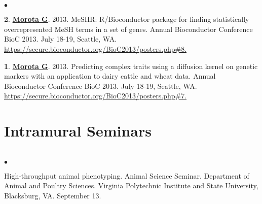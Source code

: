 \documentclass[margin,line,10pt]{res}
\newenvironment{list2}{
  \begin{list}{$\bullet$}{%
      \setlength{\itemsep}{0in}
      \setlength{\parsep}{0in} \setlength{\parskip}{0in}
      \setlength{\topsep}{0in} \setlength{\partopsep}{0in} 
      \setlength{\leftmargin}{0.2in}}}{\end{list}}
\begin{document}
\begin{resume}
\section{}
\begin{list2}
\item   [{\bf 2}.]  \textbf{\underline{Morota G}}. 2013. MeSHR: R/Bioconductor package for finding statistically overrepresented  MeSH terms in a set of genes. Annual Bioconductor Conference BioC 2013. July 18-19, Seattle, WA. \\ \textcolor{blue}{\href{https://secure.bioconductor.org/BioC2013/posters.php\#7}{https://secure.bioconductor.org/BioC2013/posters.php\#8. } }  

\vspace{0.5cm}

\item  [{\bf 1}.] \textbf{\underline{Morota G}}. 2013. Predicting complex traits using a diffusion kernel on genetic markers with an application to dairy cattle and wheat data. Annual Bioconductor Conference BioC 2013. July 18-19, Seattle, WA. \textcolor{blue}{\href{https://secure.bioconductor.org/BioC2013/posters.php\#7}{https://secure.bioconductor.org/BioC2013/posters.php\#7. } }  
\end{list2}











\vspace{0.5cm}
\section{\sc Intramural Seminars}
\vspace{1cm}

\section{}
\begin{list2}

  \item  High-throughput animal phenotyping. Animal Science Seminar. Department of Animal and Poultry Sciences. Virginia Polytechnic Institute and State University, Blacksburg, VA. September 13.


\end{list2}
\end{resume}
\end{document}
